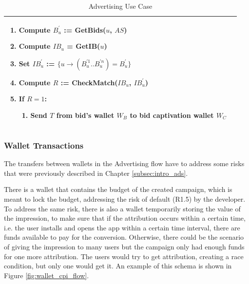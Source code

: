 \begin{table}[H]
\begin{tabular}{|p{}p{}|}
\begin{itemize}
\end{itemize}
\begin{enumerate}
	\item Compute $B^{'}_{u}$ := \textsf{GetBids}($u$, $AS$)
	\item Compute $IB_u$ = \textsf{GetIB}($u$)
	\item Set $IB^{'}_{u}$ := $\{u \to (B^{'1}_{u}..B^{'n}_{u}) = B^{'}_{u}\}$
	\item Compute $R$ := \textsf{CheckMatch}($IB_u$, $IB^{'}_{u}$)
	\item If $R = 1$:
	\begin{enumerate}
		\item Send $T$ from bid's wallet $W_B$ to bid captivation wallet $W_C$
	\end{enumerate}
\end{enumerate} & \\
\hline
\end{tabular}
\caption{Advertising Use Case}
\label{table: ads_use_case}
\end{table}


\subsubsection{Wallet Transactions}

The transfers between wallets in the Advertising flow have to address some risks that were previously described in Chapter \ref{subsec:intro_ads}.

There is a wallet that contains the budget of the created campaign, which is meant to lock the budget, addressing the risk of default (R1.5) by the developer. To address the same risk, there is also a wallet temporarily storing the value of the impression, to make sure that if the attribution occurs within a certain time, i.e. the user installs and opens the app within a certain time interval, there are funds available to pay for the conversion. Otherwise, there could be the scenario of giving the impression to many users but the campaign only had enough funds for one more attribution. The users would try to get attribution, creating a race condition, but only one would get it. An example of this schema is shown in Figure \ref{fig:wallet_cpi_flow}.

